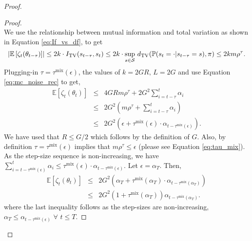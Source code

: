 \documentclass{colt2018} %
\DeclareMathOperator*{\mix}{mix}
\begin{document}
\begin{proof}
\begin{proof}
\[\]
We use the relationship between mutual information and total variation as shown in Equation \eqref{eq:If_vs_df}, to get
\begin{eqnarray*}
\abs{\mathbb{E}\left[ \zeta_t(\theta_{t-\tau}) \right]} \leq 2k \cdot I_{\text{TV}}(s_{t-\tau},s_t) \leq 2k \cdot \sup_{s \in \mathcal{S}} \, d_{\text{TV}}(\mathbb{P}(s_t = \cdot|s_{t-\tau} = s), \pi) \leq 2 k m \rho^\tau.
\end{eqnarray*}
Plugging-in $\tau = \tau^{\mix}(\epsilon)$, the values of $k=2GR, \,L=2G$ and use Equation \eqref{eq:mc_noise_rec} to get,
\begin{eqnarray*}
\mathbb{E}\left[\zeta_t(\theta_t)\right] &\leq& 4GR m \rho^\tau + 2G^2 \sum_{i=t-\tau}^t \alpha_i \\
&\leq& 2G^2 \left(m \rho^\tau + \sum_{i=t-\tau}^t \alpha_i\right) \\
&\leq& 2G^2 \left(\epsilon + \tau^{\mix}(\epsilon) \cdot \alpha_{t-\tau^{\mix}(\epsilon)} \right).
\end{eqnarray*}
We have used that $R \leq G/2$ which follows by the definition of $G$. Also, by definition $\tau = \tau^{\mix}(\epsilon)$ implies that $m \rho^\tau \leq \epsilon$ (please see Equation \eqref{eq:tau_mix}). As the step-size sequence is non-increasing, we have $\sum_{i=t-\tau^{\mix}(\epsilon)}^t \alpha_i \leq \tau^{\mix}(\epsilon) \cdot \alpha_{t-\tau^{\mix}(\epsilon)}$. Let $\epsilon = \alpha_T$. Then, 
\begin{eqnarray*}
\mathbb{E}\left[\zeta_t(\theta_t)\right] &\leq& 2G^2 \left(\alpha_T + \tau^{\mix}(\alpha_T) \cdot \alpha_{t-\tau^{\mix}(\alpha_T)} \right) \\
&\leq& 2G^2 \left(1 + \tau^{\mix}(\alpha_T) \right) \alpha_{t-\tau^{\mix}(\alpha_T)}.
\end{eqnarray*}
where the last inequality follows as the step-sizes are non-increasing, $\alpha_T \leq \alpha_{t-\tau^{\mix}(\epsilon)} \,\, \forall \,\, t \leq T$. 


\end{proof}
\end{proof}
\end{document}
